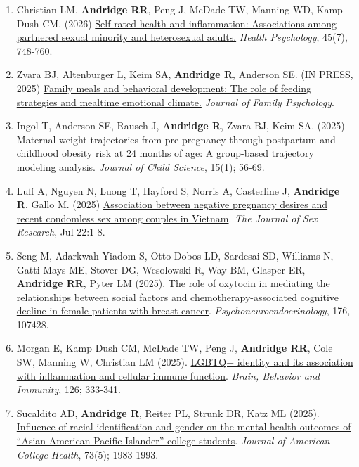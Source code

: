 \documentclass[
  english,
  letterpaper,
  DIV=11,
  numbers=noendperiod]{scrartcl}
\begin{document}
\begin{enumerate}
{  disparities}. \emph{Brain, Behavior, and Immunity}, 133; 106202.
\item
  Christian LM, \textbf{Andridge RR}, Peng J, McDade TW, Manning WD,
  Kamp Dush CM. (2026)
  \href{https://doi.org/10.1037/hea0001594}{Self-rated health and
  inflammation: Associations among partnered sexual minority and
  heterosexual adults.} \emph{Health Psychology}, 45(7), 748-760.
\item
  Zvara BJ, Altenburger L, Keim SA, \textbf{Andridge R}, Anderson SE.
  (IN PRESS, 2025) \href{https://doi.org/10.1037/fam0001430}{Family
  meals and behavioral development: The role of feeding strategies and
  mealtime emotional climate.} \emph{Journal of Family Psychology}.
\item
  Ingol T, Anderson SE, Rausch J, \textbf{Andridge R}, Zvara BJ, Keim
  SA. (2025) Maternal weight trajectories from pre-pregnancy through
  postpartum and childhood obesity risk at 24 months of age: A
  group-based trajectory modeling analysis. \emph{Journal of Child
  Science}, 15(1); 56-69.
\item
  Luff A, Nguyen N, Luong T, Hayford S, Norris A, Casterline J,
  \textbf{Andridge R}, Gallo M. (2025)
  \href{https://doi.org/10.1080/00224499.2025.2530230}{Association
  between negative pregnancy desires and recent condomless sex among
  couples in Vietnam}. \emph{The Journal of Sex Research}, Jul 22:1-8.
\item
  Seng M, Adarkwah Yiadom S, Otto-Dobos LD, Sardesai SD, Williams N,
  Gatti-Mays ME, Stover DG, Wesolowski R, Way BM, Glasper ER,
  \textbf{Andridge RR}, Pyter LM (2025).
  \href{https://doi.org/10.1016/j.psyneuen.2025.107428}{The role of
  oxytocin in mediating the relationships between social factors and
  chemotherapy-associated cognitive decline in female patients with
  breast cancer}. \emph{Psychoneuroendocrinology}, 176, 107428.
\item
  Morgan E, Kamp Dush CM, McDade TW, Peng J, \textbf{Andridge RR}, Cole
  SW, Manning W, Christian LM (2025).
  \href{https://doi.org/10.1016/j.bbi.2025.02.032}{LGBTQ+ identity and
  its association with inflammation and cellular immune function}.
  \emph{Brain, Behavior and Immunity}, 126; 333-341.
\item
  Sucaldito AD, \textbf{Andridge R}, Reiter PL, Strunk DR, Katz ML
  (2025). \href{https://doi.org/10.1080/07448481.2025.2472210}{Influence
  of racial identification and gender on the mental health outcomes of
  ``Asian American Pacific Islander'' college students}. \emph{Journal
  of American College Health}, 73(5); 1983-1993.

\end{enumerate}
\end{document}
